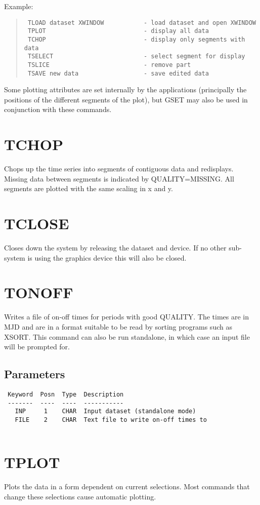 \documentclass{book}
\renewcommand{\_}{{\tt\char'137}}     %
\begin{document}
Example:
\begin{quote}\begin{verbatim}
 TLOAD dataset XWINDOW           - load dataset and open XWINDOW
 TPLOT                           - display all data
 TCHOP                           - display only segments with data
 TSELECT                         - select segment for display
 TSLICE                          - remove part
 TSAVE new data                  - save edited data
\end{verbatim}\end{quote}
Some plotting attributes are set internally by the applications
(principally the positions of the different segments of the plot),
but GSET may also be used in conjunction with these commands.
 
\section{TCHOP}
Chops up the time series into segments of contiguous data and
redisplays. Missing data between segments is indicated by
QUALITY=MISSING. All segments are plotted with the same scaling
in x and y.
 
\section{TCLOSE}
Closes down the system by releasing the dataset and device.
If no other sub-system is using the graphics device this will
also be closed.
 
\section{TONOFF}
Writes a file of on-off times for periods with good QUALITY.
The times are in MJD and are in a format suitable to be read
by sorting programs such as XSORT. This command can also
be run standalone, in which case an input file will be
prompted for.
 
\subsection{Parameters}
\begin{verbatim}
 Keyword  Posn  Type  Description
 -------  ----  ----  -----------
   INP     1    CHAR  Input dataset (standalone mode)
   FILE    2    CHAR  Text file to write on-off times to
 
\end{verbatim}\section{TPLOT}
Plots the data in a form dependent on current selections.
Most commands that change these selections cause automatic
plotting.
 
\end{document}
